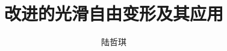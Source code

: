\documentclass[twoside,nocpsupervisor]{zjuthesis}
\title{改进的光滑自由变形及其应用}
\author{陆哲琪}
\institute{计算机学院}
\begin{document}
\maketitle
\absmatter


\tocmatter
\tableofcontents
\listoffigures
\listoftables
%
\mainmatter{}









\backmatter{}



%
%
\end{document}
